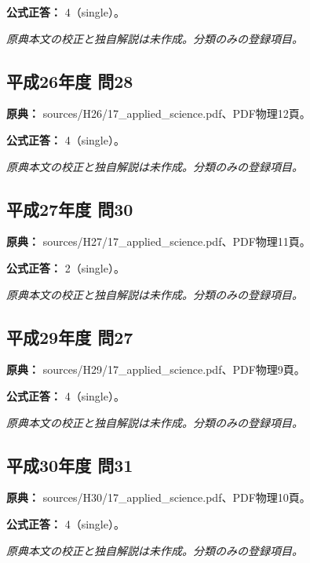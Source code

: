\textbf{公式正答：} 4（single）。

\par\textit{原典本文の校正と独自解説は未作成。分類のみの登録項目。}

\subsection{平成26年度 問28}
\label{q:h26-reg-applied-28}

\noindent\textbf{原典：} sources/H26/17\_applied\_science.pdf、PDF物理12頁。

\textbf{公式正答：} 4（single）。

\par\textit{原典本文の校正と独自解説は未作成。分類のみの登録項目。}

\subsection{平成27年度 問30}
\label{q:h27-reg-applied-30}

\noindent\textbf{原典：} sources/H27/17\_applied\_science.pdf、PDF物理11頁。

\textbf{公式正答：} 2（single）。

\par\textit{原典本文の校正と独自解説は未作成。分類のみの登録項目。}

\subsection{平成29年度 問27}
\label{q:h29-reg-applied-27}

\noindent\textbf{原典：} sources/H29/17\_applied\_science.pdf、PDF物理9頁。

\textbf{公式正答：} 4（single）。

\par\textit{原典本文の校正と独自解説は未作成。分類のみの登録項目。}

\subsection{平成30年度 問31}
\label{q:h30-reg-applied-31}

\noindent\textbf{原典：} sources/H30/17\_applied\_science.pdf、PDF物理10頁。

\textbf{公式正答：} 4（single）。

\par\textit{原典本文の校正と独自解説は未作成。分類のみの登録項目。}

